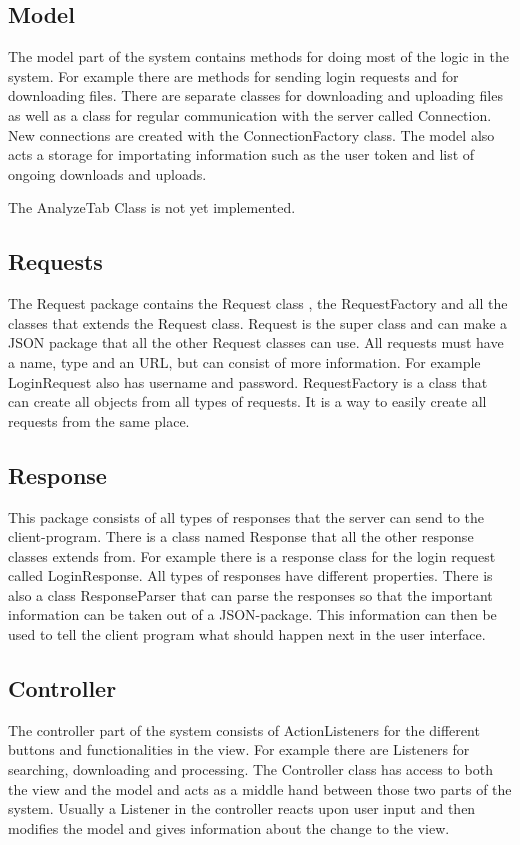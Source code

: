 \subsection{Model}
The model part of the system contains methods for doing most of the logic in the system. For example there are methods for sending login requests and for downloading files. There are separate classes for downloading and uploading files as well as a class for regular communication with the server called Connection. New connections are created with the ConnectionFactory class. The model also acts a storage for importating information such as the user token and list of ongoing downloads and uploads.

The AnalyzeTab Class is not yet implemented.

\subsection{Requests}
The Request package contains the Request class , the RequestFactory and all the classes that extends the Request class. Request is the super class and can make a JSON package that all the other Request classes can use. All requests must have a name, type and an URL, but can consist of more information. For example LoginRequest also has username and password. RequestFactory is a class that can create all objects from all types of requests. It is a way to easily create all requests from the same place.


\subsection{Response}
This package consists of all types of responses that the server can send to the client-program. There is a class named Response that all the other response classes extends from. For example there is a response class for the login request called LoginResponse. All types of responses have different properties. There is also a class ResponseParser that can parse the responses so that the important information can be taken out of a JSON-package. This information can then be used to tell the client program what should happen next in the user interface.


\subsection{Controller}
The controller part of the system consists of ActionListeners for the different buttons and functionalities in the view. For example there are Listeners for searching, downloading and processing. The Controller class has access to both the view and the model and acts as a middle hand between those two parts of the system. Usually a Listener in the controller reacts upon user input and then modifies the model and gives information about the change to the view.


